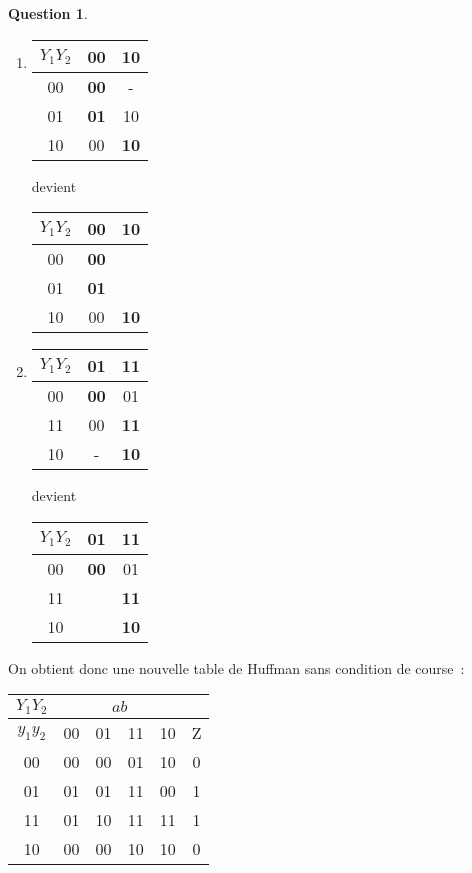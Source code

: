 \documentclass[11pt,a4paper]{article}
\theoremstyle{definition}%
\newtheorem{Q}{Question}[] %
\begin{document}
\begin{Q}
\begin{enumerate}
{\begin{enumerate}
			\item
			\begin{tabular}{|c|c|c|}\hline
				$Y_1Y_2$ & 00 & 10 \\ \hline
				00 & \textbf{00} & - \\ \hline
				01 & \textbf{01} & 10 \\ \hline
				10 & 00 & \textbf{10} \\ \hline
			\end{tabular}
			devient
			\begin{tabular}{|c|c|c|}\hline
				$Y_1Y_2$ & 00 & 10 \\ \hline
				00 & \textbf{00} & \color{green}{10} \\ \hline
				01 & \textbf{01} & \color{green}{00} \\ \hline
				10 & 00 & \textbf{10} \\ \hline
			\end{tabular}

			\item
			\begin{tabular}{|c|c|c|}\hline
				$Y_1Y_2$ & 01 & 11 \\ \hline
				00 & \textbf{00} & 01 \\ \hline
				11 & 00 & \textbf{11} \\ \hline
				10 & - & \textbf{10} \\ \hline
			\end{tabular}
			devient
			\begin{tabular}{|c|c|c|}\hline
				$Y_1Y_2$ & 01 & 11 \\ \hline
				00 & \textbf{00} & 01 \\ \hline
				11 & \color{green}{10} & \textbf{11} \\ \hline
				10 & \color{green}{00} & \textbf{10} \\ \hline
			\end{tabular}
		\end{enumerate}

		On obtient donc une nouvelle table de Huffman sans condition de course~:
		\begin{center}
			\begin{tabular}{|c|c|c|c|c|c|}\hline
			$Y_1Y_2$ & \multicolumn{4}{c|}{$ab$} & \\ \hline
			$y_1y_2$ & 00 & 01 & 11 & 10 & Z \\ \hline
			00       & 00 & 00 & {\color{green}01} & {\color{green}10} & 0 \\ \hline
			01       & 01 & 01 & 11 & {\color{green}00} & 1 \\ \hline
			11       & 01 & {\color{green}10} & 11 & 11 & 1 \\ \hline
			10       & 00 & {\color{green}00} & 10 & 10 & 0 \\ \hline
			\end{tabular}
		\end{center}

}
\end{enumerate}
\end{Q}
\end{document}
